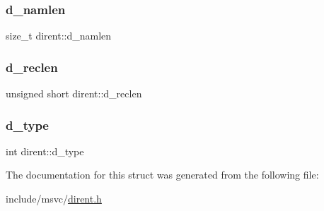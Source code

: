 \mbox{\label{structdirent_a09ced068b03cdb339e34840c8b709621}} 
\subsubsection{\texorpdfstring{d\_namlen}{d\_namlen}}
{\footnotesize\ttfamily size\+\_\+t dirent\+::d\+\_\+namlen}

\mbox{\label{structdirent_a90dc47836e8ef510437317876368859e}} 
\subsubsection{\texorpdfstring{d\_reclen}{d\_reclen}}
{\footnotesize\ttfamily unsigned short dirent\+::d\+\_\+reclen}

\mbox{\label{structdirent_ad6a736cb04c7295e8f97f708324b3500}} 
\subsubsection{\texorpdfstring{d\_type}{d\_type}}
{\footnotesize\ttfamily int dirent\+::d\+\_\+type}



The documentation for this struct was generated from the following file\+:\begin{DoxyCompactItemize}
\item 
include/msvc/\mbox{\hyperlink{dirent_8h}{dirent.\+h}}\end{DoxyCompactItemize}
